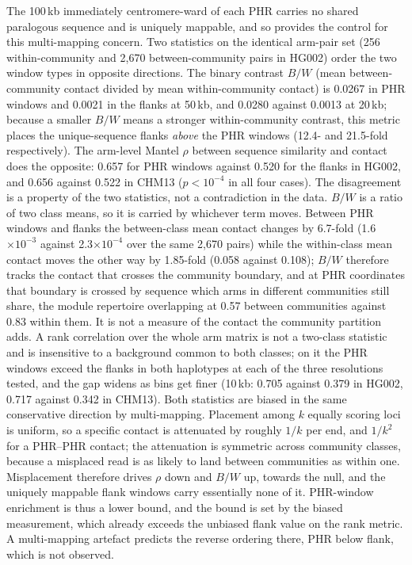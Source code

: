 The 100\,kb immediately centromere-ward of each PHR carries no shared
paralogous sequence and is uniquely mappable, and so provides the control for
this multi-mapping concern. Two statistics on the identical arm-pair set
(256 within-community and 2{,}670 between-community pairs in HG002) order the
two window types in opposite directions. The binary contrast $B/W$ (mean
between-community contact divided by mean within-community contact) is 0.0267
in PHR windows and 0.0021 in the flanks at 50\,kb, and 0.0280 against 0.0013 at
20\,kb; because a smaller $B/W$ means a stronger within-community contrast,
this metric places the unique-sequence flanks \emph{above} the PHR windows
(12.4- and 21.5-fold respectively). The arm-level Mantel $\rho$ between
sequence similarity and contact does the opposite: 0.657 for PHR windows
against 0.520 for the flanks in HG002, and 0.656 against 0.522 in CHM13
($p<10^{-4}$ in all four cases). The disagreement is a property of the two
statistics, not a contradiction in the data. $B/W$ is a ratio of two class
means, so it is carried by whichever term moves. Between PHR windows and flanks
the between-class mean contact changes by 6.7-fold (1.6$\times10^{-3}$ against
2.3$\times10^{-4}$ over the same 2{,}670 pairs) while the within-class mean
contact moves the other way by 1.85-fold (0.058 against 0.108); $B/W$ therefore
tracks the contact that crosses the community boundary, and at PHR coordinates
that boundary is crossed by sequence which arms in different communities still
share, the module repertoire overlapping at 0.57 between communities against
0.83 within them. It is not a measure of the contact the community partition
adds. A rank correlation over
the whole arm matrix is not a two-class statistic and is insensitive to a
background common to both classes; on it the PHR windows exceed the flanks in
both haplotypes at each of the three resolutions tested, and the gap widens as bins get
finer (10\,kb: 0.705 against 0.379 in HG002, 0.717 against 0.342 in CHM13).
Both statistics are biased in the same conservative direction by multi-mapping.
Placement among $k$ equally scoring loci is uniform, so a specific contact is
attenuated by roughly $1/k$ per end, and $1/k^2$ for a PHR--PHR contact; the
attenuation is symmetric across community classes, because a misplaced read is
as likely to land between communities as within one. Misplacement therefore
drives $\rho$ down and $B/W$ up, towards the null, and the uniquely mappable
flank windows carry essentially none of it. PHR-window enrichment is thus a
lower bound, and the bound is set by the biased measurement, which already
exceeds the unbiased flank value on the rank metric. A multi-mapping artefact
predicts the reverse ordering there, PHR below flank, which is not observed.

